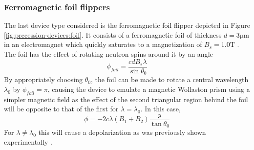 \documentclass{article}
\begin{document}
\subsubsection{Ferromagnetic foil flippers}
The last device type considered is the ferromagnetic foil flipper depicted in Figure \ref{fig:precession-devices:foil}. It consists of a ferromagnetic foil of thickness $d = 3\unit{\micro\meter}$ in an electromagnet which quickly saturates to a magnetization of $B_s = 1.0 \unit{\tesla}$ \cite{kraan2003}. The foil has the effect of rotating neutron spins around it by an angle 
$$\phi_{foil} = \frac{cdB_s\lambda}{\sin\theta_0}$$
By appropriately choosing $\theta_0$, the foil can be made to rotate a central wavelength $\lambda_0$ by $\phi_{foil} = \pi$, causing the device to emulate a magnetic Wollaston prism using a simpler magnetic field as the effect of the second triangular region behind the foil will be opposite to that of the first for $\lambda = \lambda_0$. In this case,
$$\phi = -2c\lambda (B_1 + B_2) \frac{y}{\tan\theta_0}$$
For $\lambda \neq \lambda_0$ this will cause a depolarization as was previously shown experimentally \cite{kraan2003}.
\end{document}
